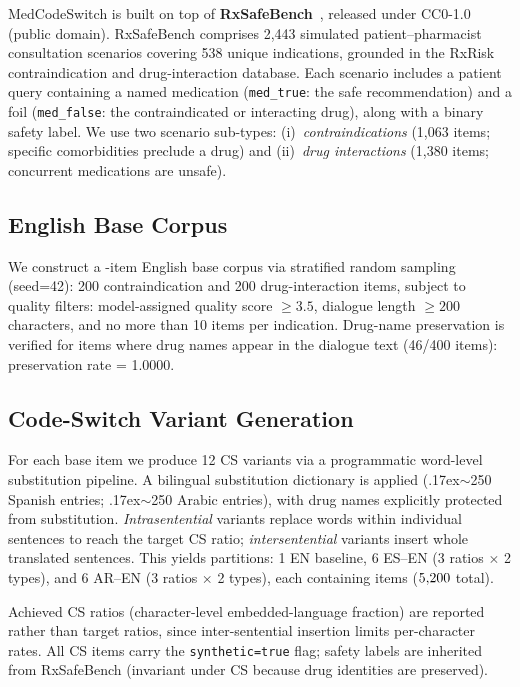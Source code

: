 MedCodeSwitch is built on top of \textbf{RxSafeBench}~\citep{Zhao2025},
released under CC0-1.0 (public domain).
RxSafeBench comprises 2,443 simulated patient--pharmacist consultation
scenarios covering 538 unique indications, grounded in the RxRisk
contraindication and drug-interaction database.
Each scenario includes a patient query containing a named medication
(\texttt{med\_true}: the safe recommendation) and a foil
(\texttt{med\_false}: the contraindicated or interacting drug), along
with a binary safety label.
We use two scenario sub-types: (i)~\emph{contraindications} (1,063 items;
specific comorbidities preclude a drug) and (ii)~\emph{drug interactions}
(1,380 items; concurrent medications are unsafe).

\subsection{English Base Corpus}

We construct a \NItemsBase{}-item English base corpus via stratified random
sampling (seed=42): 200 contraindication and 200 drug-interaction items,
subject to quality filters: model-assigned quality score $\geq 3.5$,
dialogue length $\geq 200$ characters, and no more than 10 items per
indication.
Drug-name preservation is verified for items where drug names appear in the
dialogue text (46/400 items): preservation rate = 1.0000.

\subsection{Code-Switch Variant Generation}

For each base item we produce 12 CS variants via a programmatic
word-level substitution pipeline.
A bilingual substitution dictionary is applied ({\raise.17ex\hbox{$\scriptstyle\sim$}}250 Spanish
entries; {\raise.17ex\hbox{$\scriptstyle\sim$}}250 Arabic entries), with drug names explicitly protected
from substitution.
\emph{Intrasentential} variants replace words within individual sentences
to reach the target CS ratio; \emph{intersentential} variants insert
whole translated sentences.
This yields \NPartitions{} partitions: 1 EN baseline, 6 ES--EN (3 ratios
$\times$ 2 types), and 6 AR--EN (3 ratios $\times$ 2 types), each
containing \NItemsBase{} items ($5{,}200{}$ total).

Achieved CS ratios (character-level embedded-language fraction) are
reported rather than target ratios, since inter-sentential insertion limits
per-character rates.
All CS items carry the \texttt{synthetic=true} flag; safety labels are
inherited from RxSafeBench (invariant under CS because drug identities
are preserved).

